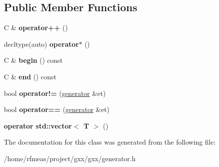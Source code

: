 \subsection*{Public Member Functions}
\begin{DoxyCompactItemize}
\item 
C \& {\bfseries operator++} ()\hypertarget{classgxx_1_1generator_ae712bb999f422b73a5b57467a259ec24}{}\label{classgxx_1_1generator_ae712bb999f422b73a5b57467a259ec24}

\item 
decltype(auto) {\bfseries operator$\ast$} ()\hypertarget{classgxx_1_1generator_a5dbbafeb8c5fe9f22cc61ba1c219d476}{}\label{classgxx_1_1generator_a5dbbafeb8c5fe9f22cc61ba1c219d476}

\item 
C \& {\bfseries begin} () const \hypertarget{classgxx_1_1generator_ad4dbda377a56d85524b27ff0bedbfd57}{}\label{classgxx_1_1generator_ad4dbda377a56d85524b27ff0bedbfd57}

\item 
C \& {\bfseries end} () const \hypertarget{classgxx_1_1generator_a7c12e267a5e761b26f420514140fb997}{}\label{classgxx_1_1generator_a7c12e267a5e761b26f420514140fb997}

\item 
bool {\bfseries operator!=} (\hyperlink{classgxx_1_1generator}{generator} \&et)\hypertarget{classgxx_1_1generator_a9919fb9533753e48148516fcecb4d06c}{}\label{classgxx_1_1generator_a9919fb9533753e48148516fcecb4d06c}

\item 
bool {\bfseries operator==} (\hyperlink{classgxx_1_1generator}{generator} \&et)\hypertarget{classgxx_1_1generator_a0d14044b7b9f8f9b71e5dd38d5a24eb2}{}\label{classgxx_1_1generator_a0d14044b7b9f8f9b71e5dd38d5a24eb2}

\item 
{\bfseries operator std\+::vector$<$ T $>$} ()\hypertarget{classgxx_1_1generator_a0ebb3bdcbe3f35d74036a3e0f7392a1e}{}\label{classgxx_1_1generator_a0ebb3bdcbe3f35d74036a3e0f7392a1e}

\end{DoxyCompactItemize}


The documentation for this class was generated from the following file\+:\begin{DoxyCompactItemize}
\item 
/home/rfmeas/project/gxx/gxx/generator.\+h\end{DoxyCompactItemize}
